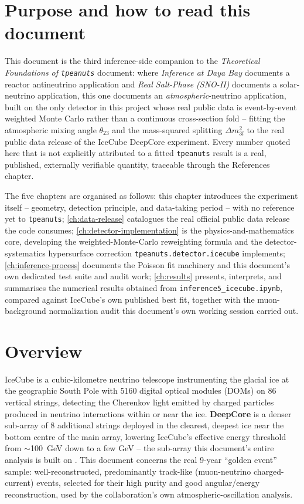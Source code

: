 \label{ch:introduction}

\section{Purpose and how to read this document}

This document is the third inference-side companion to the \emph{Theoretical
Foundations of \texttt{tpeanuts}} document: where \emph{Inference at Daya
Bay} documents a reactor antineutrino application and \emph{Real Salt-Phase
(SNO-II)} documents a solar-neutrino application, this one documents an
\emph{atmospheric}-neutrino application, built on the only detector in this
project whose real public data is event-by-event weighted Monte Carlo
rather than a continuous cross-section fold -- fitting the atmospheric
mixing angle $\theta_{23}$ and the mass-squared splitting $\Delta m^2_{3l}$
to the real public data release of the IceCube DeepCore experiment. Every
number quoted here that is not explicitly attributed to a fitted
\texttt{tpeanuts} result is a real, published, externally verifiable
quantity, traceable through the References chapter.

The five chapters are organised as follows: this chapter introduces the
experiment itself -- geometry, detection principle, and data-taking period
-- with no reference yet to \texttt{tpeanuts}; \cref{ch:data-release}
catalogues the real official public data release the code consumes;
\cref{ch:detector-implementation} is the physics-and-mathematics core,
developing the weighted-Monte-Carlo reweighting formula and the
detector-systematics hypersurface correction \texttt{tpeanuts.detector.icecube}
implements; \cref{ch:inference-process} documents the Poisson fit machinery
and this document's own dedicated test suite and audit work;
\cref{ch:results} presents, interprets, and summarises the numerical
results obtained from \texttt{inference5\_icecube.ipynb}, compared against
IceCube's own published best fit, together with the muon-background
normalization audit this document's own working session carried out.

\section{Overview}

IceCube is a cubic-kilometre neutrino telescope instrumenting the glacial
ice at the geographic South Pole with 5160 digital optical modules (DOMs)
on 86 vertical strings, detecting the Cherenkov light emitted by charged
particles produced in neutrino interactions within or near the ice.
\textbf{DeepCore} is a denser sub-array of 8 additional strings deployed in
the clearest, deepest ice near the bottom centre of the main array,
lowering IceCube's effective energy threshold from $\sim$100~GeV down to a
few GeV -- the sub-array this document's entire analysis is built on
\parencite{Abbasi2023IceCube}. This document concerns the real 9-year
``golden event'' sample: well-reconstructed, predominantly track-like
(muon-neutrino charged-current) events, selected for their high purity and
good angular/energy reconstruction, used by the collaboration's own
atmospheric-oscillation analysis.

